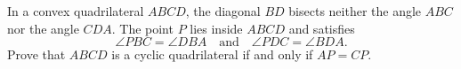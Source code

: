In a convex quadrilateral $ABCD$,
the diagonal $BD$ bisects neither the angle $ABC$ nor the angle $CDA$.
The point $P$ lies inside $ABCD$ and satisfies
\[\angle PBC=\angle DBA \quad\text{and}\quad \angle PDC=\angle BDA. \]
Prove that $ABCD$ is a cyclic quadrilateral
if and only if $AP=CP$.